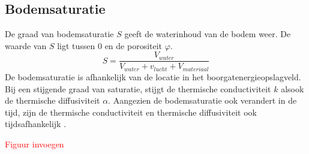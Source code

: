 \documentclass[a4paper,oneside,11pt]{report}
\numberwithin{figure}{section}
\numberwithin{table}{section}
\numberwithin{equation}{section}
\begin{document}
\subsection*{Bodemsaturatie}
De graad van bodemsaturatie $S$ geeft de waterinhoud van de bodem weer. De waarde van $S$ ligt tussen 0 en de porositeit $\varphi$. 
\begin{equation}\label{invlf_eq3}
S=\dfrac{V_{water}}{V_{water}+v_{lucht}+V_{materiaal}}
\end{equation}
De bodemsaturatie is afhankelijk van de locatie in het boorgatenergieopslagveld. Bij een stijgende graad van saturatie, stijgt de thermische conductiviteit $k$ alsook de thermische diffusiviteit $\alpha$. Aangezien de bodemsaturatie ook verandert in de tijd, zijn de thermische conductiviteit en thermische diffusiviteit ook tijdsafhankelijk \cite{R2}.

\textcolor{red}{Figuur invoegen}



\end{document}

